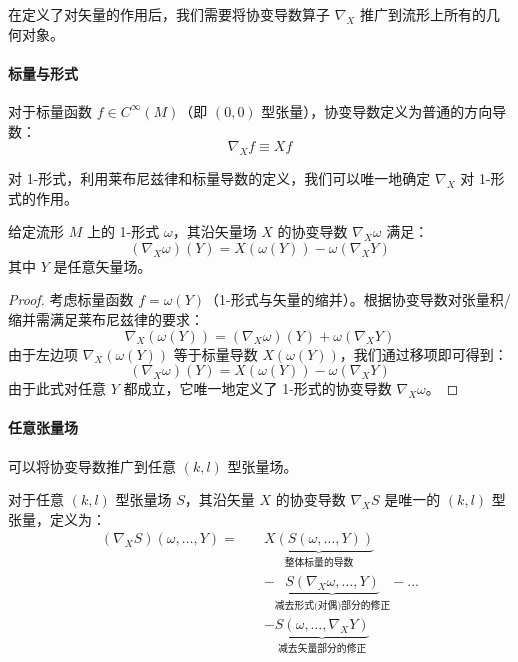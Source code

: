在定义了对矢量的作用后，我们需要将协变导数算子 $\nabla_X$ 推广到流形上所有的几何对象。

\paragraph{标量与形式}
对于标量函数 $f \in C^\infty(M)$（即 $(0,0)$ 型张量），协变导数定义为普通的方向导数：
\begin{equation}
    \nabla_X f \equiv Xf
\end{equation}

对 1-形式，利用莱布尼兹律和标量导数的定义，我们可以唯一地确定 $\nabla_X$ 对 1-形式的作用。

\begin{theorem}[1-形式的协变导数]
    给定流形 $M$ 上的 1-形式 $\omega$，其沿矢量场 $X$ 的协变导数 $\nabla_X \omega$ 满足：
    \begin{equation}
        (\nabla_X \omega)(Y) = X(\omega(Y)) - \omega(\nabla_X Y)
    \end{equation}
    其中 $Y$ 是任意矢量场。
\end{theorem}

\begin{proof}
    考虑标量函数 $f = \omega(Y)$（1-形式与矢量的缩并）。根据协变导数对张量积/缩并需满足莱布尼兹律的要求：
    \begin{equation}
        \nabla_X (\omega(Y)) = (\nabla_X \omega)(Y) + \omega(\nabla_X Y)
    \end{equation}
    由于左边项 $\nabla_X (\omega(Y))$ 等于标量导数 $X(\omega(Y))$，我们通过移项即可得到：
    \begin{equation*}
        (\nabla_X \omega)(Y) = X(\omega(Y)) - \omega(\nabla_X Y)
    \end{equation*}
    由于此式对任意 $Y$ 都成立，它唯一地定义了 1-形式的协变导数 $\nabla_X \omega$。
\end{proof}

\paragraph{任意张量场}
可以将协变导数推广到任意 $(k, l)$ 型张量场。

\begin{definition}[张量场的协变导数]
    对于任意 $(k, l)$ 型张量场 $S$，其沿矢量 $X$ 的协变导数 $\nabla_X S$ 是唯一的 $(k, l)$ 型张量，定义为：
    \begin{equation}
    \begin{split}
        (\nabla_X S)(\omega, \dots, Y) = \quad & \underbrace{X(S(\omega, \dots, Y))}_{\text{整体标量的导数}} \\
        & - \underbrace{S(\nabla_X \omega, \dots, Y)}_{\text{减去形式(对偶)部分的修正}} - \dots \\
        & - \underbrace{S(\omega, \dots, \nabla_X Y)}_{\text{减去矢量部分的修正}}
    \end{split}
    \end{equation}
\end{definition}
